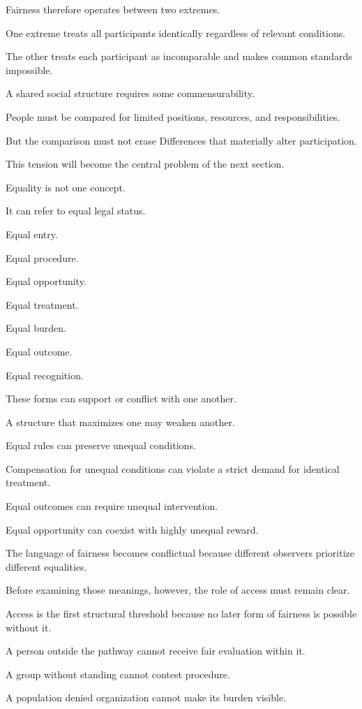 Fairness therefore operates between two extremes.

One extreme treats all participants identically regardless of relevant conditions.

The other treats each participant as incomparable and makes common standards impossible.

A shared social structure requires some commensurability.

People must be compared for limited positions, resources, and responsibilities.

But the comparison must not erase Differences that materially alter participation.

This tension will become the central problem of the next section.

Equality is not one concept.

It can refer to equal legal status.

Equal entry.

Equal procedure.

Equal opportunity.

Equal treatment.

Equal burden.

Equal outcome.

Equal recognition.

These forms can support or conflict with one another.

A structure that maximizes one may weaken another.

Equal rules can preserve unequal conditions.

Compensation for unequal conditions can violate a strict demand for identical treatment.

Equal outcomes can require unequal intervention.

Equal opportunity can coexist with highly unequal reward.

The language of fairness becomes conflictual because different observers prioritize different equalities.

Before examining those meanings, however, the role of access must remain clear.

Access is the first structural threshold because no later form of fairness is possible without it.

A person outside the pathway cannot receive fair evaluation within it.

A group without standing cannot contest procedure.

A population denied organization cannot make its burden visible.

